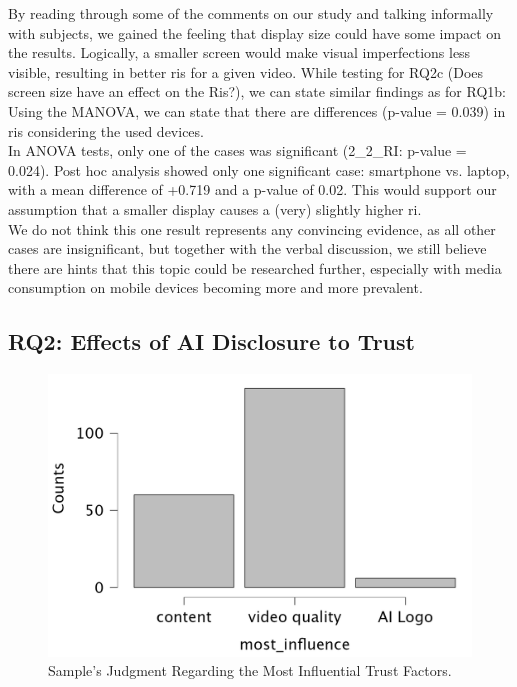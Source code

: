 \documentclass[
  a4paper,  %
  twoside,  %
  bibliography=totoc,
  headsepline,
  cleardoublepage=empty,
  parskip=half,
  draft=false
]{scrbook}
\begin{document}
By reading through some of the comments on our study and talking informally with subjects, we gained the feeling that display size could have some impact on the results. Logically, a smaller screen would make visual imperfections less visible, resulting in better \gls{ri}s for a given video. While testing for RQ2c (Does screen size have an effect on the Ris?), we can state similar findings as for RQ1b: Using the MANOVA, we can state that there are differences (p-value = 0.039) in \gls{ri}s considering the used devices. \\
In ANOVA tests, only one of the cases was significant (2\_2\_RI: p-value = 0.024). Post hoc analysis showed only one significant case: smartphone vs. laptop, with a mean difference of +0.719 and a p-value of 0.02. This would support our assumption that a smaller display causes a (very) slightly higher \gls{ri}. \\
We do not think this one result represents any convincing evidence, as all other cases are insignificant, but together with the verbal discussion, we still believe there are hints that this topic could be researched further, especially with media consumption on mobile devices becoming more and more prevalent.

\subsection{RQ2: Effects of AI Disclosure to Trust}
\label{subsec:RQ2}

\begin{figure}[h]
  \centering
  \includegraphics[width=.5\textwidth]{graphics/statistics/most-influence.png}
  \caption{Sample's Judgment Regarding the Most Influential Trust Factors.}
  \label{fig:most-influence}
\end{figure}
\end{document}
